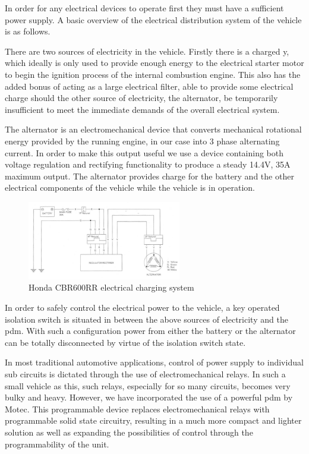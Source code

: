 In order for any electrical devices to operate first they must have a sufficient power supply.  A basic overview of the electrical distribution system of the vehicle is as follows.

There are two sources of electricity in the vehicle.  Firstly there is a charged 
y, which ideally is only used to provide enough energy to the electrical starter motor to begin the ignition process of the internal combustion engine.  This also has the added bonus of acting as a large electrical filter, able to provide some electrical charge should the other source of electricity, the alternator, be temporarily insufficient to meet the immediate demands of the overall electrical system.

The alternator is an electromechanical device that converts mechanical rotational energy provided by the running engine, in our case into 3 phase alternating current.  In order to make this output useful we use a device containing both voltage regulation and rectifying functionality to produce a steady 14.4V, 35A maximum output.  The alternator provides charge for the battery and the other electrical components of the vehicle while the vehicle is in operation.

\begin{figure}[h]
	\centering
	\includegraphics[width=0.6\textwidth]{CBR600_Power_System.png}
	\caption{Honda CBR600RR electrical charging system \cite[17-2]{CBR600_Manual}}
	\label{fig:CBR600_Power_System}
\end{figure}

In order to safely control the electrical power to the vehicle, a key operated isolation switch is situated in between the above sources of electricity and the \acrshort{pdm}.  With such a configuration power from either the battery or the alternator can be totally disconnected by virtue of the isolation switch state.

In most traditional automotive applications, control of power supply to individual sub circuits is dictated through the use of electromechanical relays.  In such a small vehicle as this, such relays, especially for so many circuits, becomes very bulky and heavy.  However, we have incorporated the use of a powerful \acrshort{pdm} by Motec.  This programmable device replaces electromechanical relays with programmable solid state circuitry, resulting in a much more compact and lighter solution as well as expanding the possibilities of control through the programmability of the unit.

